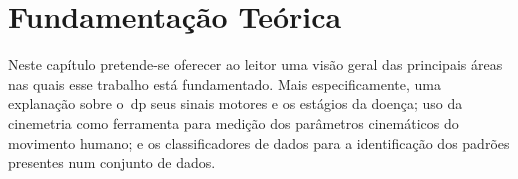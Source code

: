 \chapter{Fundamentação Teórica}\label{chapter:fundamentacao}
Neste capítulo pretende-se oferecer ao leitor uma visão geral das principais áreas nas quais esse trabalho está fundamentado. Mais especificamente, uma explanação sobre o~\ac{dp} seus sinais motores e os estágios da doença; uso da cinemetria como ferramenta para medição dos parâmetros cinemáticos do movimento humano; e os classificadores de dados para a identificação dos padrões presentes num conjunto de dados.






